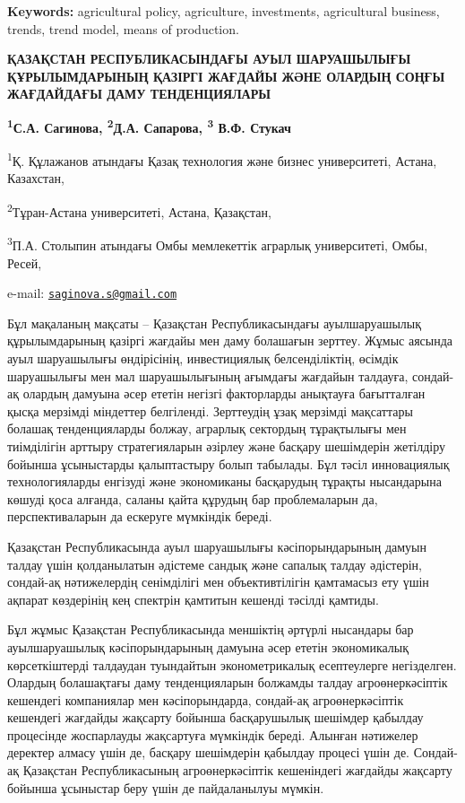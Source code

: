 {\bfseries Keywords:} agricultural policy, agriculture, investments,
agricultural business, trends, trend model, means of production.
\begin{articleheader}

{\bfseries ҚАЗАҚСТАН РЕСПУБЛИКАСЫНДАҒЫ АУЫЛ ШАРУАШЫЛЫҒЫ ҚҰРЫЛЫМДАРЫНЫҢ
ҚАЗІРГІ ЖАҒДАЙЫ ЖӘНЕ ОЛАРДЫҢ СОҢҒЫ ЖАҒДАЙДАҒЫ ДАМУ ТЕНДЕНЦИЯЛАРЫ}

{\bfseries \textsuperscript{1}С.А. Сагинова\textsuperscript{\envelope },
\textsuperscript{2}Д.А. Сапарова, \textsuperscript{3} В.Ф. Стукач}
\end{articleheader}
\begin{affiliation}

\textsuperscript{1}Қ. Құлажанов атындағы Қазақ технология және бизнес
университеті, Астана, Казахстан,

\textsuperscript{2}Тұран-Астана университеті, Астана, Қазақстан,

\textsuperscript{3}П.А. Столыпин атындағы Омбы мемлекеттік аграрлық
университеті, Омбы, Ресей,

e-mail:
\href{mailto:saginova.s@gmail.com}{\nolinkurl{saginova.s@gmail.com}}
\end{affiliation}

Бұл мақаланың мақсаты -- Қазақстан Республикасындағы ауылшаруашылық
құрылымдарының қазіргі жағдайы мен даму болашағын зерттеу. Жұмыс аясында
ауыл шаруашылығы өндірісінің, инвестициялық белсенділіктің, өсімдік
шаруашылығы мен мал шаруашылығының ағымдағы жағдайын талдауға, сондай-ақ
олардың дамуына әсер ететін негізгі факторларды анықтауға бағытталған
қысқа мерзімді міндеттер белгіленді. Зерттеудің ұзақ мерзімді мақсаттары
болашақ тенденцияларды болжау, аграрлық сектордың тұрақтылығы мен
тиімділігін арттыру стратегияларын әзірлеу және басқару шешімдерін
жетілдіру бойынша ұсыныстарды қалыптастыру болып табылады. Бұл тәсіл
инновациялық технологияларды енгізуді және экономиканы басқарудың
тұрақты нысандарына көшуді қоса алғанда, саланы қайта құрудың бар
проблемаларын да, перспективаларын да ескеруге мүмкіндік береді.

Қазақстан Республикасында ауыл шаруашылығы кәсіпорындарының дамуын
талдау үшін қолданылатын әдістеме сандық және сапалық талдау әдістерін,
сондай-ақ нәтижелердің сенімділігі мен объективтілігін қамтамасыз ету
үшін ақпарат көздерінің кең спектрін қамтитын кешенді тәсілді қамтиды.

Бұл жұмыс Қазақстан Республикасында меншіктің әртүрлі нысандары бар
ауылшаруашылық кәсіпорындарының дамуына әсер ететін экономикалық
көрсеткіштерді талдаудан туындайтын эконометрикалық есептеулерге
негізделген. Олардың болашақтағы даму тенденцияларын болжамды талдау
агроөнеркәсіптік кешендегі компаниялар мен кәсіпорындарда, сондай-ақ
агроөнеркәсіптік кешендегі жағдайды жақсарту бойынша басқарушылық
шешімдер қабылдау процесінде жоспарлауды жақсартуға мүмкіндік береді.
Алынған нәтижелер деректер алмасу үшін де, басқару шешімдерін қабылдау
процесі үшін де. Сондай-ақ Қазақстан Республикасының агроөнеркәсіптік
кешеніндегі жағдайды жақсарту бойынша ұсыныстар беру үшін де
пайдаланылуы мүмкін.

